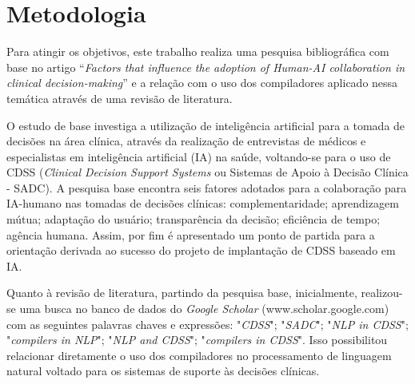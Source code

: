 \documentclass[12pt]{article}
\begin{document}


  
\section{Metodologia} \label{sec:firstpage}

Para atingir os objetivos, este trabalho realiza uma pesquisa bibliográfica com base no artigo “\textit{Factors that influence the adoption of Human-AI collaboration in clinical decision-making}” \cite{artigo_base} e a relação com o uso dos compiladores aplicado nessa temática através de uma revisão de literatura.

O estudo de base investiga a utilização de inteligência artificial para a tomada de decisões na área clínica, através da realização de entrevistas de médicos e especialistas em inteligência artificial (IA) na saúde, voltando-se para o uso de CDSS (\textit{Clinical Decision Support Systems} ou Sistemas de Apoio à Decisão Clínica - SADC). A pesquisa base encontra seis fatores adotados para a colaboração para IA-humano nas tomadas de decisões clínicas: complementaridade; aprendizagem mútua; adaptação do usuário; transparência da decisão; eficiência de tempo; agência humana. Assim, por fim é apresentado um ponto de partida para a orientação derivada ao sucesso do projeto de implantação de CDSS baseado em IA.

Quanto à revisão de literatura, partindo da pesquisa base, inicialmente, realizou-se uma busca no banco de dados do \textit{Google Scholar} (www.scholar.google.com) com as seguintes palavras chaves e expressões: "\textit{CDSS}"; "\textit{SADC}"; "\textit{NLP in CDSS}"; "\textit{compilers in NLP}"; "\textit{NLP and CDSS}"; "\textit{compilers in CDSS}". Isso possibilitou relacionar diretamente o uso dos compiladores no processamento de linguagem natural voltado para os sistemas de suporte às decisões clínicas.
\end{document}
